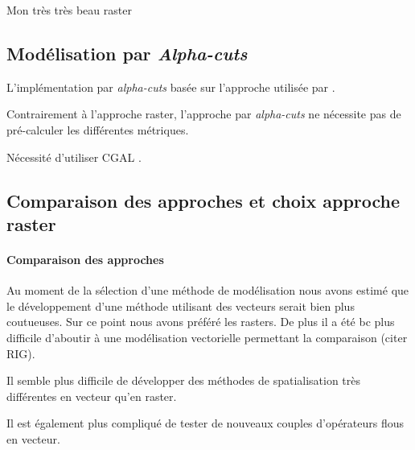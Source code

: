 \begin{carte}
  \centering
  
  \caption{Mon très très beau raster}
  \label{fig:ZLP_SOUS_HT}
\end{carte}


\subsection{Modélisation par \emph{Alpha-cuts}}

L'implémentation par \emph{alpha-cuts} basée sur l'approche utilisée
par \textcite{Runz2008a,Zoghlami2016}.


Contrairement à l'approche raster, l'approche par \emph{alpha-cuts} ne
nécessite pas de pré-calculer les différentes métriques.


Nécessité d'utiliser CGAL \autocite{CGAL2019}.




\subsection{Comparaison des approches et choix approche raster}

\paragraph{Comparaison des approches}


Au moment de la sélection d'une méthode de modélisation nous avons
estimé que le développement d'une méthode utilisant des vecteurs
serait bien plus coutueuses. Sur ce point nous avons préféré les
rasters. De plus il a été bc plus difficile d'aboutir à une
modélisation vectorielle permettant la comparaison (citer RIG).


Il semble plus difficile de développer des méthodes de spatialisation
très différentes en vecteur qu'en raster.

Il est également plus compliqué de tester de nouveaux couples
d'opérateurs flous en vecteur.


